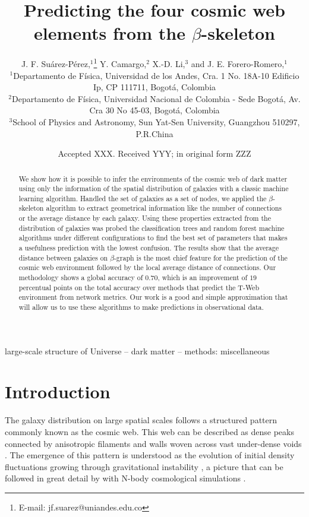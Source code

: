 \documentclass[usenatbib]{mnras}
\title[Cosmic web elements and the $\beta$-skeleton]{Predicting the four cosmic web
  elements from the $\beta$-skeleton}
\author[J. F. Su\'arez-P\'erez et al.]{
J. F. Su\'arez-P\'erez,$^{1}$\thanks{E-mail: jf.suarez@uniandes.edu.co}
Y. Camargo,$^{2}$ 
X.-D. Li,$^{3}$
and J. E. Forero-Romero,$^{1}$
\\
$^{1}$Departamento de F\'isica, Universidad de los Andes, Cra. 1
No. 18A-10 Edificio Ip, CP 111711, Bogot\'a, Colombia\\ 
$^{2}$Departamento de F\'isica, Universidad Nacional de Colombia -
Sede Bogot\'a, Av. Cra 30 No 45-03, Bogot\'a, Colombia\\ 
$^{3}$School of Physics and Astronomy, Sun Yat-Sen University,
Guangzhou 510297, P.R.China\\ 
}
\date{Accepted XXX. Received YYY; in original form ZZZ}
\begin{document}
\label{firstpage}
\pagerange{\pageref{firstpage}--\pageref{lastpage}}
\maketitle

\begin{abstract}

We show how it is possible to infer the environments of the cosmic web
of dark matter using only the information of the spatial distribution
of galaxies with a classic machine learning algorithm. 
Handled the set of galaxies as a set of nodes, we applied the
$\beta$-skeleton algorithm to extract geometrical information like the
number of connections or the average distance by each galaxy. 
Using these properties extracted from the distribution of galaxies was
probed the classification trees and random forest machine algorithms
under different configurations to find the best set of parameters that
makes a usefulness prediction with the lowest confusion.  
The results show that the average distance between galaxies on
$\beta$-graph is the most chief feature for the prediction of the
cosmic web environment followed by the local average distance of
connections.  
Our methodology shows a global accuracy of $0.70$, which is an
improvement of $19$ percentual points on the total accuracy over
methods that predict the T-Web environment from network metrics. 
Our work is a good and simple approximation that will allow us to use
these algorithms to make predictions in observational data. 
\end{abstract}

\begin{keywords}
large-scale structure of Universe -- dark matter -- methods: miscellaneous
\end{keywords}


\section{Introduction}
The galaxy distribution on large spatial scales follows a structured 
pattern commonly known as the cosmic web. 
This web can be described as dense peaks connected by anisotropic
filaments and walls woven across vast under-dense voids 
\citep{Bond1996}.  
The emergence of this pattern is understood as the evolution of
initial density fluctuations growing through gravitational instability
\citep{ZelDovich1970,White1987}, a picture that can be followed in
great detail by with N-body cosmological simulations
\citep{1999ApJ...526..568S,2014Natur.509..177V}.     
\end{document}

